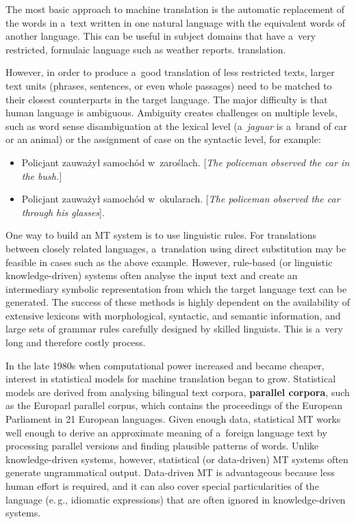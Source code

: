 \begin{multicols}{2}
The most basic approach to machine translation is the automatic
replacement of the words in a~text written in one natural language
with the equivalent words of another language. This can be useful in
subject domains that have a~very restricted, formulaic language such
as weather reports. 
translation.


However, in order to produce a~good translation of less restricted
texts, larger text units (phrases, sentences, or even whole passages)
need to be matched to their closest counterparts in the target
language. The major difficulty is that human language is ambiguous.
Ambiguity creates challenges on multiple levels, such as word sense
disambiguation at the lexical level (a~\textit{jaguar} is a~brand of
car or an animal) or the assignment of case on the syntactic level,
for example: 

\begin{itemize} \item Policjant zauważył samochód w~zaroślach.
[\textit{The policeman observed the car in the bush.}] \item Policjant
zauważył samochód w~okularach. [\textit{The policeman observed the
car through his glasses}]. \end{itemize} 

One way to build an MT system is to use linguistic rules. For
translations between closely related languages, a~translation using
direct substitution may be feasible in cases such as the above
example. However, rule-based (or linguistic knowledge-driven) systems
often analyse the input text and create an intermediary symbolic
representation from which the target language text can be generated.
The success of these methods is highly dependent on the availability
of extensive lexicons with morphological, syntactic, and semantic
information, and large sets of grammar rules carefully designed by
skilled linguists. This is a~very long and therefore costly process. 

In the late 1980s when computational power increased and became
cheaper, interest in statistical models for machine translation began
to grow. Statistical models are derived from analysing bilingual text
corpora, \textbf{parallel corpora}, such as the Europarl parallel
corpus, which contains the proceedings of the European Parliament in
21 European languages. Given enough data, statistical MT works well
enough to derive an approximate meaning of a~foreign language text by
processing parallel versions and finding plausible patterns of words.
Unlike knowledge-driven systems, however, statistical (or data-driven)
MT systems often generate ungrammatical output. Data-driven MT is
advantageous because less human effort is required, and it can also
cover special particularities of the language (e.\,g., idiomatic
expressions) that are often ignored in knowledge-driven systems. 


\end{multicols}

